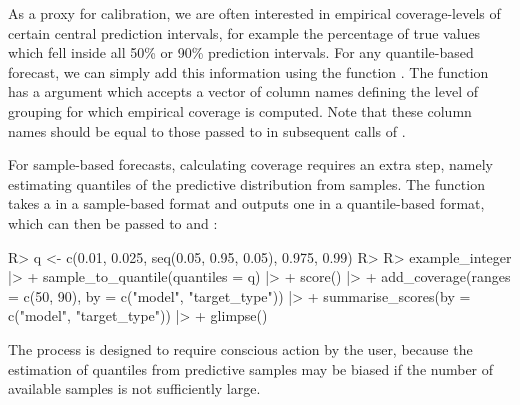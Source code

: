 \documentclass[
]{jss}
\begin{document}
As a proxy for calibration, we are often interested in empirical
coverage-levels of certain central prediction intervals, for example the
percentage of true values which fell inside all 50\% or 90\% prediction
intervals. For any quantile-based forecast, we can simply add this
information using the function . The function has
a  argument which accepts a vector of column names defining the
level of grouping for which empirical coverage is computed. Note that
these column names should be equal to those passed to  in
subsequent calls of .

For sample-based forecasts, calculating coverage requires an extra step,
namely estimating quantiles of the predictive distribution from samples.
The function  takes a  in
a sample-based format and outputs one in a quantile-based format, which
can then be passed to  and :

\begin{CodeChunk}
\begin{CodeInput}
R> q <- c(0.01, 0.025, seq(0.05, 0.95, 0.05), 0.975, 0.99)
R>
R> example_integer |>
+   sample_to_quantile(quantiles = q) |>
+   score() |>
+   add_coverage(ranges = c(50, 90), by = c("model", "target_type")) |>
+   summarise_scores(by = c("model", "target_type")) |>
+   glimpse()
\end{CodeInput}
\end{CodeChunk}

The process is designed to require conscious action by the user, because
the estimation of quantiles from predictive samples may be biased if the
number of available samples is not sufficiently large.
\end{document}
